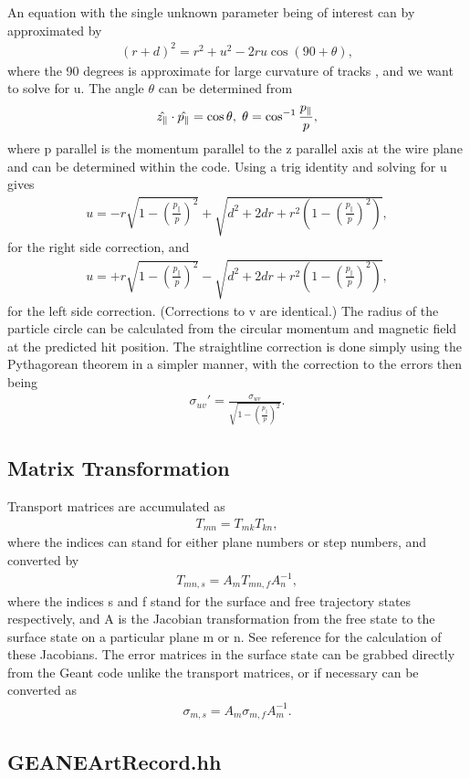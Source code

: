   An equation with the single unknown parameter being of interest can by approximated by
	\begin{align}
		(r+d)^{2} = r^{2}+u^{2}-2ru\cos(90+\theta),
	\end{align}
  where the 90 degrees is approximate for large curvature of tracks , and we want to solve for u. The angle $\theta$ can be determined from 
	\begin{align}
		\hat{z_{\parallel}} \cdot \hat{p_{\parallel}} = \cos{\theta}, \hspace{.1cm} \theta = \cos^{-1}{\frac{p_{\parallel}}{p}}, 
	\end{align}
  where p parallel is the momentum parallel to the z parallel axis at the wire plane and can be determined within the code. Using a trig identity and solving for u gives
	\begin{align}
		u = -r\sqrt{1-(\frac{p_{\parallel}}{p})^{2}} + \sqrt{d^{2} + 2dr + r^{2}(1-(\frac{p_{\parallel}}{p})^{2})},
	\end{align}
  for the right side correction, and 
	\begin{align}
		u = +r\sqrt{1-(\frac{p_{\parallel}}{p})^{2}} - \sqrt{d^{2} + 2dr + r^{2}(1-(\frac{p_{\parallel}}{p})^{2})},
	\end{align}
  for the left side correction. (Corrections to v are identical.) The radius of the particle circle can be calculated from the circular momentum and magnetic field at the predicted hit position. The straightline correction is done simply using the Pythagorean theorem in a simpler manner, with the correction to the errors then being
	\begin{align}
		\sigma_{uv}' = \frac{\sigma_{uv}}{\sqrt{1-(\frac{p_{\parallel}}{p})^{2}}}.
	\end{align}


\subsection{Matrix Transformation}
\label{sec:MatTransf}

  Transport matrices are accumulated as
      \begin{align} %
        T_{mn} = T_{mk}T_{kn},
      \end{align}
  where the indices can stand for either plane numbers or step numbers, and converted by 
      \begin{align} %
        T_{mn,s} = A_{m} T_{mn,f} A_{n}^{-1},
      \end{align}     
  where the indices s and f stand for the surface and free trajectory states respectively, and A is the Jacobian transformation from the free state to the surface state on a particular plane m or n. See reference \cite{jacob} for the calculation of these Jacobians. The error matrices in the surface state can be grabbed directly from the Geant code unlike the transport matrices, or if necessary can be converted as
      \begin{align} %
        \sigma_{m,s} = A_{m} \sigma_{m,f} A_{m}^{-1}.
      \end{align}  



\subsection{GEANEArtRecord.hh} 


